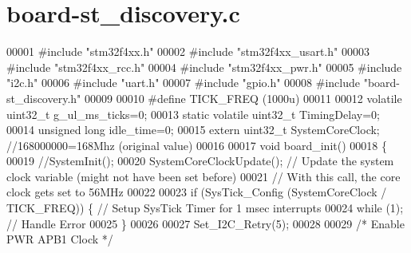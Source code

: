 \section{board-\/st\+\_\+discovery.c}
\label{board-st__discovery_8c_source}

\begin{DoxyCode}
00001 \textcolor{preprocessor}{#}\textcolor{preprocessor}{include} "stm32f4xx.h"
00002 \textcolor{preprocessor}{#}\textcolor{preprocessor}{include} "stm32f4xx_usart.h"
00003 \textcolor{preprocessor}{#}\textcolor{preprocessor}{include} "stm32f4xx_rcc.h"
00004 \textcolor{preprocessor}{#}\textcolor{preprocessor}{include} "stm32f4xx_pwr.h"
00005 \textcolor{preprocessor}{#}\textcolor{preprocessor}{include} "i2c.h"
00006 \textcolor{preprocessor}{#}\textcolor{preprocessor}{include} "uart.h"
00007 \textcolor{preprocessor}{#}\textcolor{preprocessor}{include} "gpio.h"
00008 \textcolor{preprocessor}{#}\textcolor{preprocessor}{include} "board-st_discovery.h"
00009 
00010 \textcolor{preprocessor}{#}\textcolor{preprocessor}{define} \textcolor{preprocessor}{TICK\_FREQ} \textcolor{preprocessor}{(}1000u\textcolor{preprocessor}{)}
00011 
00012 \textcolor{keyword}{volatile} uint32\_t g_ul_ms_ticks=0;
00013 \textcolor{keyword}{static} \textcolor{keyword}{volatile} uint32\_t TimingDelay=0;
00014 \textcolor{keywordtype}{unsigned} \textcolor{keywordtype}{long} idle_time=0;
00015 \textcolor{keyword}{extern} uint32\_t SystemCoreClock; \textcolor{comment}{//168000000=168Mhz (original value)}
00016 
00017 \textcolor{keywordtype}{void} board_init()
00018 \{
00019     \textcolor{comment}{//SystemInit();}
00020     SystemCoreClockUpdate();                               \textcolor{comment}{// Update the system clock variable (might
       not have been set before)}
00021                                                            \textcolor{comment}{// With this call, the core clock gets set
       to 56MHz}
00022 
00023     \textcolor{keywordflow}{if} (SysTick\_Config (SystemCoreClock / TICK_FREQ)) \{     \textcolor{comment}{// Setup SysTick Timer for 1 msec
       interrupts}
00024         \textcolor{keywordflow}{while} (1);                                          \textcolor{comment}{// Handle Error}
00025     \}
00026 
00027     Set_I2C_Retry(5);
00028 
00029     \textcolor{comment}{/* Enable PWR APB1 Clock */}

\end{DoxyCode}
